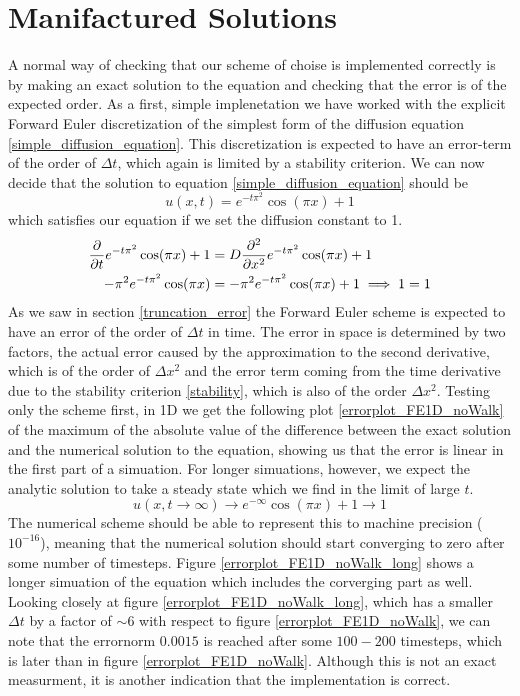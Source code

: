 \section{Manifactured Solutions}
A normal way of checking that our scheme of choise is implemented correctly is by making an exact solution to the equation and checking that the error is of the expected order. 
As a first, simple implenetation we have worked with the explicit Forward Euler discretization of the simplest form of the diffusion equation \ref{simple_diffusion_equation}. 
This discretization is expected to have an error-term of the order of $\Delta t$, which again is limited by a stability criterion. 
We can now decide that the solution to equation \ref{simple_diffusion_equation} should be
\begin{equation}\label{manifactured_solution_1D}
 u(x,t) = e^{-t\pi^2}\cos(\pi x) +1
\end{equation}
which satisfies our equation if we set the diffusion constant to 1.
\begin{align}
 \frac{\partial }{\partial t}e^{-t\pi^2}\cos(\pi x) +1 &= D\frac{\partial^2}{\partial x^2}e^{-t\pi^2}\cos(\pi x) +1\\
 -\pi^2e^{-t\pi^2}\cos(\pi x) &= -\pi^2e^{-t\pi^2}\cos(\pi x) +1 \implies 1 = 1
\end{align}
As we saw in section \ref{truncation_error} the Forward Euler scheme is expected to have an error of the order of $\Delta t$ in time. 
The error in space is determined by two factors, the actual error caused by the approximation to the second derivative, which is of the order of $\Delta x^2$ and the error term coming from the time derivative due to the stability criterion \ref{stability}, which is also of the order $\Delta x^2$. 
Testing only the scheme first, in 1D we get the following plot \ref{errorplot_FE1D_noWalk} of the maximum of the absolute value of the difference between the exact solution and the numerical solution to the equation, showing us that the error is linear in the first part of a simuation. 
For longer simuations, however, we expect the analytic solution to take a steady state which we find in the limit of large $t$. 
\begin{equation}
 u(x,t\to\infty) \to e^{-\infty}\cos(\pi x) +1 \to 1
\end{equation}
The numerical scheme should be able to represent this to machine precision ($10^{-16}$), meaning that the numerical solution should start converging to zero after some number of timesteps. 
Figure \ref{errorplot_FE1D_noWalk_long} shows a longer simuation of the equation which includes the corverging part as well. 
Looking closely at figure \ref{errorplot_FE1D_noWalk_long}, which has a smaller $\Delta t$ by a factor of $\sim6$ with respect to figure \ref{errorplot_FE1D_noWalk}, we can note that the errornorm $0.0015$ is reached after some $100-200$ timesteps, which is later than in figure \ref{errorplot_FE1D_noWalk}. 
Although this is not an exact measurment, it is another indication that the implementation is correct.

